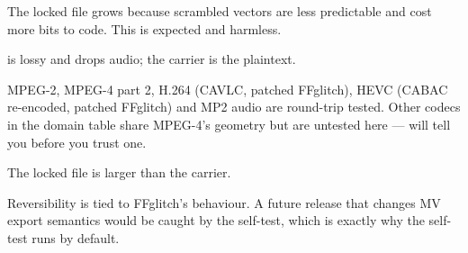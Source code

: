 \documentclass[fontpath=fonts/,logopath=logo/]{riposte-doc}
\begin{document}
The locked file grows because scrambled vectors are less predictable and cost more bits to code. This is expected and harmless.



\begin{ripbullets}
\item {} is lossy and drops audio; the carrier is the plaintext.
\item MPEG-2, MPEG-4 part 2, H.264 (CAVLC, patched FFglitch), HEVC (CABAC re-encoded, patched FFglitch) and MP2 audio are round-trip tested. Other codecs in the domain table share MPEG-4's geometry but are untested here —  will tell you before you trust one.
\item The locked file is larger than the carrier.
\item Reversibility is tied to FFglitch's behaviour. A future release that changes MV export semantics would be caught by the self-test, which is exactly why the self-test runs by default.
\end{ripbullets}

\ripend
\end{document}
